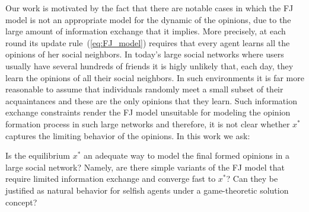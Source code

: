 Our work is motivated by the fact that there are notable cases
in which the FJ model is not an appropriate model for the dynamic of
the opinions, due to the  large amount of information exchange that it implies. 
More precisely, at each round its update 
rule~(\ref{eq:FJ_model}) requires that every agent learns all the opinions of her social neighbors.  In
today's large social networks where users usually have several hundreds of
friends it is higly unlikely that, each day, they learn the opinions of all their
social neighbors.  In such environments it is far more reasonable to assume
that individuals randomly meet a small subset of their acquaintances and these
are the only opinions that they learn. Such information exchange constraints
render the FJ model unsuitable for modeling the opinion formation process in
such large networks and therefore, it is not clear whether $x^*$ captures the
limiting behavior of the opinions. In this work we ask:
%
\begin{question}\label{q:motivation1}
  Is the equilibrium $x^*$ an adequate way to model the final formed opinions
  in a large social network? Namely, are there simple variants of the FJ model
  that require limited information exchange and converge fast to $x^*$? Can
  they be justified as natural behavior for selfish agents under a
  game-theoretic solution concept?
\end{question}

